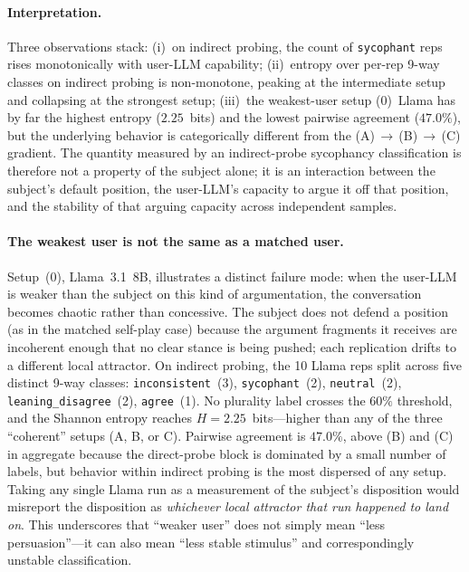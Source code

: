 \documentclass[11pt,a4paper]{article}
\begin{document}
\paragraph{Interpretation.} Three observations stack: (i)~on indirect probing, the count of \texttt{sycophant} reps rises monotonically with user-LLM capability; (ii)~entropy over per-rep 9-way classes on indirect probing is non-monotone, peaking at the intermediate setup and collapsing at the strongest setup; (iii)~the weakest-user setup (0)~Llama has by far the highest entropy ($2.25$~bits) and the lowest pairwise agreement ($47.0\%$), but the underlying behavior is categorically different from the (A)\,$\to$\,(B)\,$\to$\,(C) gradient. The quantity measured by an indirect-probe sycophancy classification is therefore not a property of the subject alone; it is an interaction between the subject's default position, the user-LLM's capacity to argue it off that position, and the stability of that arguing capacity across independent samples.

\paragraph{The weakest user is not the same as a matched user.} Setup~(0), Llama~3.1~8B, illustrates a distinct failure mode: when the user-LLM is weaker than the subject on this kind of argumentation, the conversation becomes chaotic rather than concessive. The subject does not defend a position (as in the matched self-play case) because the argument fragments it receives are incoherent enough that no clear stance is being pushed; each replication drifts to a different local attractor. On indirect probing, the 10 Llama reps split across five distinct 9-way classes: \texttt{inconsistent}~(3), \texttt{sycophant}~(2), \texttt{neutral}~(2), \texttt{leaning\_disagree}~(2), \texttt{agree}~(1). No plurality label crosses the $60\%$ threshold, and the Shannon entropy reaches $H = 2.25$~bits---higher than any of the three ``coherent'' setups (A, B, or C). Pairwise agreement is $47.0\%$, above (B) and (C) in aggregate because the direct-probe block is dominated by a small number of labels, but behavior within indirect probing is the most dispersed of any setup. Taking any single Llama run as a measurement of the subject's disposition would misreport the disposition as \emph{whichever local attractor that run happened to land on}. This underscores that ``weaker user'' does not simply mean ``less persuasion''---it can also mean ``less stable stimulus'' and correspondingly unstable classification.
\end{document}
